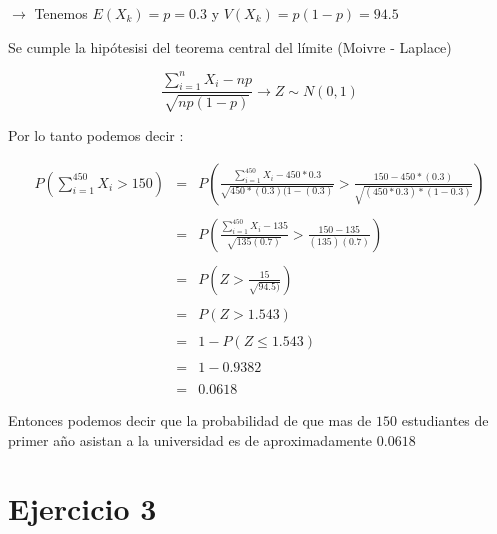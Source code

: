 \documentclass[10pt]{article}
\begin{document}
   	\begin{flushleft}
   	   	$\to$ Tenemos $ E(X_k) = p = 0.3 $ y $V(X_k) = p\left(1-p\right) = 94.5$
    \end{flushleft}
    
    \begin{flushleft}
   		Se cumple la hip\'otesisi del teorema central del l\'imite (Moivre - Laplace)
   	\end{flushleft}
   	
    \begin{equation*}
	   	\displaystyle\frac{\sum_{i=1}^{n} X_i -np}{\sqrt{np\left(1-p\right)}} \longrightarrow Z\sim N (0,1)
	\end{equation*}
    \begin{flushleft}
	   	Por lo tanto podemos decir : 
    \end{flushleft}
   	\begin{equation*}
	   	\begin{array}{rcl}
	   		\displaystyle P\left(\sum_{i=1}^{450}X_{i} > 150 \right) & = & \displaystyle P\left(\frac{\sum_{i=1}^{450}X_{i} - 450 * 0.3}{\sqrt{ 450 * (0.3)(1-(0.3)}}  > \frac{150 - 450 * (0.3)}{\sqrt{(450 * 0.3)*(1- 0.3)}}\right) 
	   	  	\\
	   	    \\
			   & = & \displaystyle P\left(\frac{\sum_{i=1}^{450}X_{i} - 135}{\sqrt{135(0.7)}}  > \frac{150 - 135}{(135)(0.7)}\right) 
	   		\\
	   		\\
			& = & 	\displaystyle P\left(Z > \frac{15}{\sqrt{94.5)}}\right) 
			\\
			\\
			& = & P\left(Z > 1.543\right)
			\\
			\\
			& = & 1 - P\left(Z \leq 1.543\right)
			\\
			\\
			& = & 1 - 0.9382
			\\
			\\
			& = &0.0618
	   	\end{array}
	\end{equation*}
	
	\begin{flushleft}
		Entonces podemos decir que la probabilidad de que mas de $150$ estudiantes de primer a\~no asistan a la universidad es de aproximadamente $0.0618$
	\end{flushleft}
	   
	
	\section*{Ejercicio 3 } 
\end{document}
